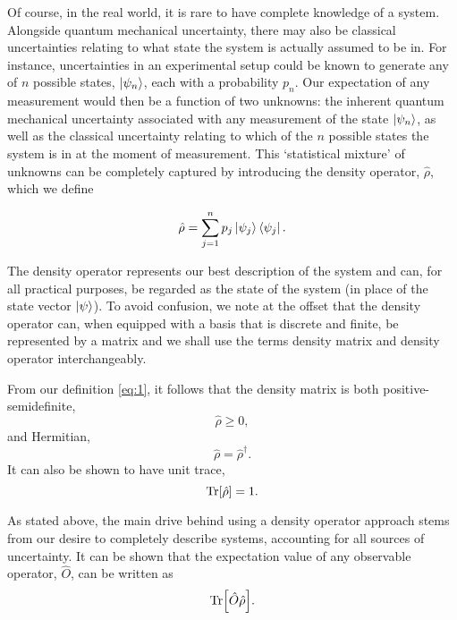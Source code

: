 \documentclass[11pt,a4paper]{article}
\numberwithin{equation}{section}
\begin{document}
	Of course, in the real world, it is rare to have complete knowledge of a system. Alongside quantum mechanical uncertainty, there may also be classical uncertainties relating to what state the system is actually assumed to be in. For instance, uncertainties in an experimental setup could be known to generate any of $n$ possible states, $\ket{\psi_n}$, each with a probability $p_n$. Our expectation of any measurement would then be a function of two unknowns: the inherent quantum mechanical uncertainty associated with any measurement of the state $\ket{\psi_n}$, as well as the classical uncertainty relating to which of the $n$ possible states the system is in at the moment of measurement. This `statistical mixture' of unknowns can be completely captured by introducing the density operator, $\hat{\rho}$, which we define \cite{Fano57}
	
	\begin{equation} \label{eq:1}
	\hat{\rho} = \sum_{j=1}^{n} p_j \ket{\psi_j}\bra{\psi_j}.
	\end{equation}
	
	The density operator represents our best description of the system and can, for all practical purposes, be regarded as the state of the system (in place of the state vector $\ket{\psi}$). To avoid confusion, we note at the offset that the density operator can, when equipped with a basis that is discrete and finite, be represented by a matrix and we shall use the terms density matrix and density operator interchangeably.
	
	From our definition \ref{eq:1}, it follows that the density matrix is both positive-semidefinite, 
	\begin{equation} \label{eq:2}
	\hat{\rho} \geq 0,
	\end{equation}
	and Hermitian,
	\begin{equation} \label{eq:3}
	\hat{\rho} = \hat{\rho}^\dagger .
	\end{equation}
	It can also be shown to have unit trace, 
	\begin{equation} \label{eq:4}
	\Tr[\hat{\rho}] = 1.
	\end{equation}
	
	As stated above, the main drive behind using a density operator approach stems from our desire to completely describe systems, accounting for all sources of uncertainty. It can be shown that the expectation value of any observable operator, $\hat{O}$, can be written as
	\begin{equation} \label{eq:5}
	\Tr[\hat{O}\hat{\rho}].
	\end{equation}
	
\end{document}
